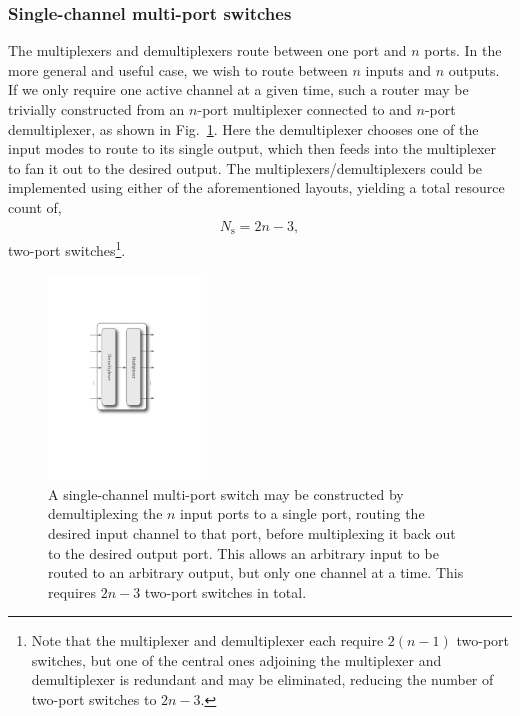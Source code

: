 %
%

\subsubsection{Single-channel multi-port switches} 

The multiplexers and demultiplexers route between one port and $n$ ports. In the more general and useful case, we wish to route between $n$ inputs and $n$ outputs. If we only require one active channel at a given time, such a router may be trivially constructed from an $n$-port multiplexer connected to and $n$-port demultiplexer, as shown in Fig.~\ref{fig:single_channel_multi_port_switch}. Here the demultiplexer chooses one of the input modes to route to its single output, which then feeds into the multiplexer to fan it out to the desired output. The multiplexers/demultiplexers could be implemented using either of the aforementioned layouts, yielding a total resource count of,
\begin{align}
	N_\mathrm{s} = 2n-3,
\end{align}
two-port switches\footnote{Note that the multiplexer and demultiplexer each require \mbox{$2(n-1)$} two-port switches, but one of the central ones adjoining the multiplexer and demultiplexer is redundant and may be eliminated, reducing the number of two-port switches to \mbox{$2n-3$}.}.

\begin{figure}[!htbp]
\includegraphics[clip=true, width=0.375\textwidth]{single_channel_multi_port_switch}
\captionspacefig \caption{A single-channel multi-port switch may be constructed by demultiplexing the $n$ input ports to a single port, routing the desired input channel to that port, before multiplexing it back out to the desired output port. This allows an arbitrary input to be routed to an arbitrary output, but only one channel at a time. This requires \mbox{$2n-3$} two-port switches in total.} \label{fig:single_channel_multi_port_switch} 	
\end{figure}

